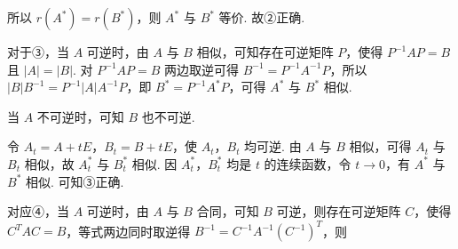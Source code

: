 


所以 $r(A^*)=r(B^*)$，则 $A^*$ 与 $B^*$ 等价. 故②正确.

对于③，当 $A$ 可逆时，由 $A$ 与 $B$ 相似，可知存在可逆矩阵 $P$，使得 $P^{-1}AP=B$ 且 $|A|=|B|$. 对 $P^{-1}AP=B$ 两边取逆可得 $B^{-1}=P^{-1}A^{-1}P$，所以 $|B|B^{-1}=P^{-1}|A|A^{-1}P$，即 $B^*=P^{-1}A^*P$，可得 $A^*$ 与 $B^*$ 相似.

当 $A$ 不可逆时，可知 $B$ 也不可逆.

令 $A_t=A+tE$，$B_t=B+tE$，使 $A_t$，$B_t$ 均可逆. 由 $A$ 与 $B$ 相似，可得 $A_t$ 与 $B_t$ 相似，故 $A_t^*$ 与 $B_t^*$ 相似. 因 $A_t^*$，$B_t^*$ 均是 $t$ 的连续函数，令 $t\to0$，有 $A^*$ 与 $B^*$ 相似. 可知③正确.

对应④，当 $A$ 可逆时，由 $A$ 与 $B$ 合同，可知 $B$ 可逆，则存在可逆矩阵 $C$，使得 $C^{T}AC=B$，等式两边同时取逆得 $B^{-1}=C^{-1}A^{-1}(C^{-1})^{T}$，则


